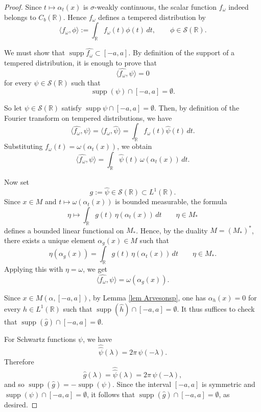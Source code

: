 \documentclass[12pt]{amsart}
\theoremstyle{definition}
\begin{document}
\begin{proof}
Since $t\mapsto \alpha_t(x)$ is $\sigma$-weakly continuous,
the scalar function $f_\omega$
indeed belongs to $C_b(\mathbb R)$.
Hence $f_\omega$ defines a tempered distribution by
\[
\langle f_\omega,\phi\rangle:=\int_{\mathbb R} f_\omega(t)\phi(t)\,dt,
\qquad \phi\in \mathcal S(\mathbb R).
\]

We must show that $\operatorname{supp}\widehat{f_\omega}\subset [-a,a]$.
By definition of the support of a tempered distribution, it is enough to prove
that
\[
\langle \widehat{f_\omega},\psi\rangle =0
\]
for every $\psi\in \mathcal S(\mathbb R)$ such that
\[
\operatorname{supp}(\psi)\cap [-a,a]=\emptyset.
\]

So let $\psi\in \mathcal S(\mathbb R)$ satisfy
$\operatorname{supp}\psi\cap [-a,a]=\emptyset$. Then, by definition of the
Fourier transform on tempered distributions, we have
\[
\langle \widehat{f_\omega},\psi\rangle
=
\langle f_\omega,\widehat{\psi}\rangle
=
\int_{\mathbb R} f_\omega(t)\widehat{\psi}(t)\,dt.
\]
Substituting $f_\omega(t)=\omega(\alpha_t(x))$, we obtain
\[
\langle \widehat{f_\omega},\psi\rangle
=
\int_{\mathbb R}\widehat{\psi}(t)\,\omega(\alpha_t(x))\,dt.
\]

Now set
\[
g:=\widehat{\psi}\in \mathcal S(\mathbb R)\subset L^1(\mathbb R).
\]
Since $x\in M$ and $t\mapsto \omega(\alpha_t(x))$ is bounded measurable, the
formula
\[
\eta\mapsto \int_{\mathbb R} g(t)\,\eta(\alpha_t(x))\,dt
\qquad \eta\in M_*
\]
defines a bounded linear functional on $M_*$. Hence, by the duality
$M=(M_*)^*$, there exists a unique element $\alpha_g(x)\in M$ such that
\[
\eta(\alpha_g(x))
=
\int_{\mathbb R} g(t)\,\eta(\alpha_t(x))\,dt
\qquad \eta\in M_*.
\]
Applying this with $\eta=\omega$, we get
\[
\langle \widehat{f_\omega},\psi\rangle
=
\omega(\alpha_g(x)).
\]

Since
$x\in M(\alpha,[-a,a])$, by Lemma \ref{lem Arvesonsp}, one has $\alpha_h(x)=0$
for every $h\in L^1(\mathbb R)$ such that $\operatorname{supp}(\widehat{h})\cap [-a,a]=\emptyset$.  
It thus suffices to check that $\operatorname{supp}(\widehat{g})\cap [-a,a]=\emptyset$.

For Schwartz functions $\psi$, we have
\[
\widehat{\widehat{\psi}}(\lambda)=2\pi\,\psi(-\lambda).
\]
Therefore
\[
\widehat{g}(\lambda)=\widehat{\widehat{\psi}}(\lambda)=2\pi\,\psi(-\lambda),
\]
 and so $\operatorname{supp}(\widehat{g})=-\operatorname{supp}(\psi)$.
Since the interval $[-a,a]$ is symmetric and
$\operatorname{supp}(\psi)\cap [-a,a]=\emptyset$, it follows that $\operatorname{supp}(\widehat{g})\cap [-a,a]=\emptyset$, as desired.  
\end{proof}
\end{document}
